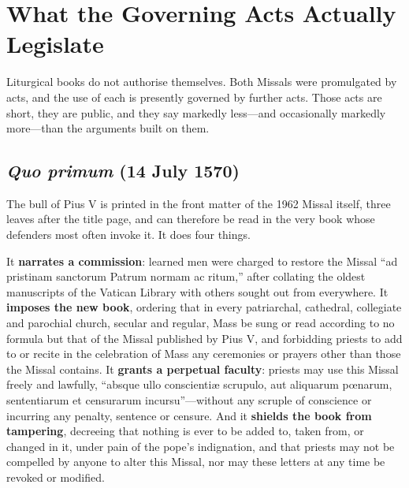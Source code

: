 \section{What the Governing Acts Actually Legislate}

Liturgical books do not authorise themselves. Both Missals were promulgated by acts, and the use of each is presently governed by further acts. Those acts are short, they are public, and they say markedly less---and occasionally markedly more---than the arguments built on them.

\subsection{\emph{Quo primum} (14 July 1570)}

The bull of Pius V is printed in the front matter of the 1962 Missal itself, three leaves after the title page, and can therefore be read in the very book whose defenders most often invoke it. It does four things.

It \textbf{narrates a commission}: learned men were charged to restore the Missal ``ad pristinam sanctorum Patrum normam ac ritum,'' after collating the oldest manuscripts of the Vatican Library with others sought out from everywhere. It \textbf{imposes the new book}, ordering that in every patriarchal, cathedral, collegiate and parochial church, secular and regular, Mass be sung or read according to no formula but that of the Missal published by Pius V, and forbidding priests to add to or recite in the celebration of Mass any ceremonies or prayers other than those the Missal contains. It \textbf{grants a perpetual faculty}: priests may use this Missal freely and lawfully, ``absque ullo conscientiæ scrupulo, aut aliquarum pœnarum, sententiarum et censurarum incursu''---without any scruple of conscience or incurring any penalty, sentence or censure. And it \textbf{shields the book from tampering}, decreeing that nothing is ever to be added to, taken from, or changed in it, under pain of the pope's indignation, and that priests may not be compelled by anyone to alter this Missal, nor may these letters at any time be revoked or modified.

